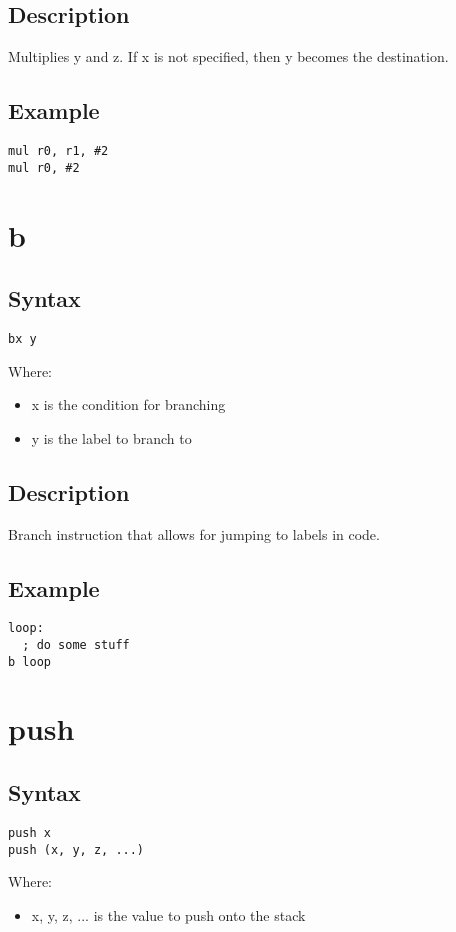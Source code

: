 \documentclass[11pt]{scrartcl}
\begin{document}
\subsection{Description}
Multiplies y and z. If x is not specified, then y becomes the destination.
\subsection{Example}
\begin{verbatim}
mul r0, r1, #2
mul r0, #2
\end{verbatim}

\section{b}
\subsection{Syntax}
\begin{verbatim}
bx y
\end{verbatim}
Where:
\begin{itemize}
    \item x is the condition for branching
    \item y is the label to branch to
\end{itemize}
\subsection{Description}
Branch instruction that allows for jumping to labels in code.
\subsection{Example}
\begin{verbatim}
loop:
  ; do some stuff
b loop
\end{verbatim}

\section{push}
\subsection{Syntax}
\begin{verbatim}
push x
push (x, y, z, ...)
\end{verbatim}
Where:
\begin{itemize}
    \item x, y, z, ... is the value to push onto the stack
\end{itemize}
\end{document}
